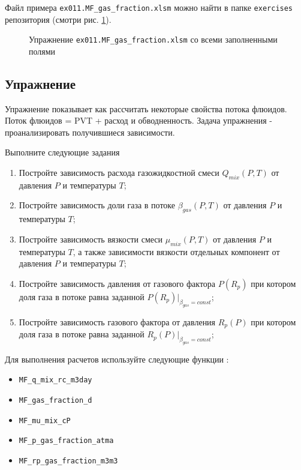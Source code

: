 Файл примера \texttt{ex011.MF\_gas\_fraction.xlsm} можно найти в папке \texttt{exercises} репозитория \unf{} (смотри рис. \ref{ris:Ex11_1}).

\begin{figure}[h!]
	\center{\texttt{[image: Ex11\_1]}}
	\caption{Упражнение \texttt{ex011.MF\_gas\_fraction.xlsm}  со всеми заполненными полями }
	\label{ris:Ex11_1}
\end{figure}

\subsection{Упражнение}
Упражнение показывает как рассчитать некоторые свойства потока флюидов. Поток флюидов = PVT + расход и обводненность. Задача упражнения - проанализировать получившиеся зависимости.

Выполните следующие задания
\begin{enumerate}
	\item Постройте зависимость расхода газожидкостной смеси $Q_{mix}(P,T)$ от давления $P$ и температуры $T$; 
	\item Постройте зависимость доли газа в потоке $\beta_{gas}(P,T)$ от давления $P$ и температуры $T$;
	\item Постройте зависимость вязкости смеси $\mu_{mix}(P,T)$ от давления $P$ и температуры $T$, а также зависимости вязкости отдельных компонент от давления $P$ и температуры $T$; 
	\item Постройте зависимость давления  от газового фактора $P(R_p)$ при котором доля газа в потоке  равна заданной  $P(R_p)|_{\beta_{gas} = const}$;
	
	\item Постройте зависимость газового фактора от давления $R_p(P)$  при котором доля газа в потоке равна заданной $R_p(P)|_{\beta_{gas} = const}$; 
 	
\end{enumerate}

Для выполнения расчетов используйте следующие функции \unf{}:
\begin{itemize}

	\item \texttt{MF\_q\_mix\_rc\_m3day}
	\item \texttt{MF\_gas\_fraction\_d}
	\item \texttt{MF\_mu\_mix\_cP}
	\item \texttt{MF\_p\_gas\_fraction\_atma}
	\item \texttt{MF\_rp\_gas\_fraction\_m3m3}

\end{itemize}

